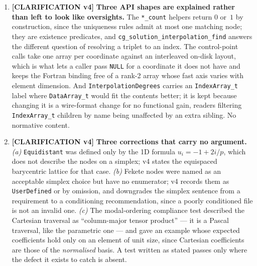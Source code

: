 \documentclass[11pt,letterpaper]{article}
\newif\ifvfourdraft
\newenvironment{v4block}{\ifvfourdraft\color{v4violet}\fi\ignorespaces}{\par}
\newcommand{\CLARIFYIV}{\ifvfourdraft
  \textcolor{v4violet}{\textbf{[CLARIFICATION v4]}}\else
  \textcolor{clarifybrown}{\textbf{[CLARIFICATION v4]}}\fi}
\begin{document}
{\begin{v4block}
\begin{enumerate}[leftmargin=1.4em,itemsep=0.5em]
    The split is not cosmetic.  Creating a node is collective, so a ranged writer
    that created on demand would let a later rank's create discard an earlier
    rank's range; the ranged writers therefore \emph{require} the array to exist
    and report an error naming \texttt{create} when it does not.

    These are the three API entries v4 adds, and the scope note above is
    qualified accordingly.  They are in scope for \emph{this} proposal rather
    than a later one because the node, its encodings and its existing accessors
    are all defined here: an accessor that cannot be called from the kind of
    writer this standard is aimed at is an incomplete API for a node this
    document introduces, not a new capability.  \textit{Impact:} none --- nothing
    is changed or removed, the whole-array writer is untouched, and the on-disk
    layout is identical.

  \item \CLARIFYIV{} \textbf{Three API shapes are explained rather than left to
    look like oversights.}  The \texttt{*\_count} helpers return $0$ or~$1$ by
    construction, since the uniqueness rules admit at most one matching node; they
    are existence predicates, and \texttt{cg\_solution\_interpolation\_find}
    answers the different question of resolving a triplet to an index.  The
    control-point calls take one array per coordinate against an interleaved
    on-disk layout, which is what lets a caller pass \texttt{NULL} for a
    coordinate it does not have and keeps the Fortran binding free of a rank-2
    array whose fast axis varies with element dimension.  And
    \texttt{InterpolationDegrees} carries an \texttt{IndexArray\_t} label where
    \texttt{DataArray\_t} would fit the contents better; it is kept because
    changing it is a wire-format change for no functional gain, readers filtering
    \texttt{IndexArray\_t} children by name being unaffected by an extra sibling.
    No normative content.

  \item \CLARIFYIV{} \textbf{Three corrections that carry no argument.}
    \emph{(a)} \texttt{Equidistant} was defined only by the 1D formula
    $u_i = -1+2i/p$, which does not describe the nodes on a simplex; v4 states the
    equispaced barycentric lattice for that case.  \emph{(b)} Fekete nodes were
    named as an acceptable simplex choice but have no enumerator; v4 records them
    as \texttt{UserDefined} or by omission, and downgrades the simplex sentence
    from a requirement to a conditioning recommendation, since a poorly
    conditioned file is not an invalid one.  \emph{(c)} The modal-ordering
    compliance test described the Cartesian traversal as ``column-major tensor
    product'' --- it is a Pascal traversal, like the parametric one --- and gave an
    example whose expected coefficients hold only on an element of unit size,
    since Cartesian coefficients are those of the \emph{normalised} basis.  A test
    written as stated passes only where the defect it exists to catch is absent.


\end{enumerate}
\end{v4block}}
\end{document}
